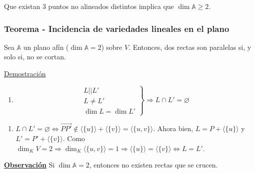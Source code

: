 \documentclass[12pt, a4paper, ones, notitlepage, openany,titlepage]{article}
\newcommand{\demostracion}{\noindent\underline{Demostración}}
\newcommand{\observacion}{\noindent\underline{\textbf{Observación}}}
\begin{document}
\noindent Que existan 3 puntos no alineados distintos implica que $\dim \mathbb{A} \ge 2$.

\subsubsection{Teorema - Incidencia de variedades lineales en el plano}
Sea $\mathbb{A}$ un plano afín ($\dim \mathbb{A} = 2$) sobre $V$. Entonces, dos rectas son paralelas si, y solo si, no se cortan.

\demostracion
\begin{enumerate}[label=$\Longrightarrow/$]
	\item $$
	\left. \begin{array}{r}
		L || L' \\
		L \neq L' \\
		\dim L = \dim L'
	\end{array} \right\} \Longrightarrow L \cap L' = \varnothing
	$$
\end{enumerate}
\begin{enumerate}[label=$\Longleftarrow/$]
	\item $L \cap L' = \varnothing \Longleftrightarrow \overrightarrow{PP'} \notin \langle\{u\}\rangle + \langle\{v\}\rangle = \langle\{u,v\}\rangle$. Ahora bien, $L = P + \langle\{u\}\rangle$ y $L' = P' + \langle\{v\}\rangle$. Como $\dim_K V = 2 \Longrightarrow \dim_K \langle\{u,v\}\rangle = 1 \Longrightarrow \langle\{u\}\rangle = \langle\{v\}\rangle \Longleftrightarrow L = L'$.
\end{enumerate}
\observacion
\noindent Si $\dim \mathbb{A} = 2$, entonces no existen rectas que se crucen.
\end{document}

